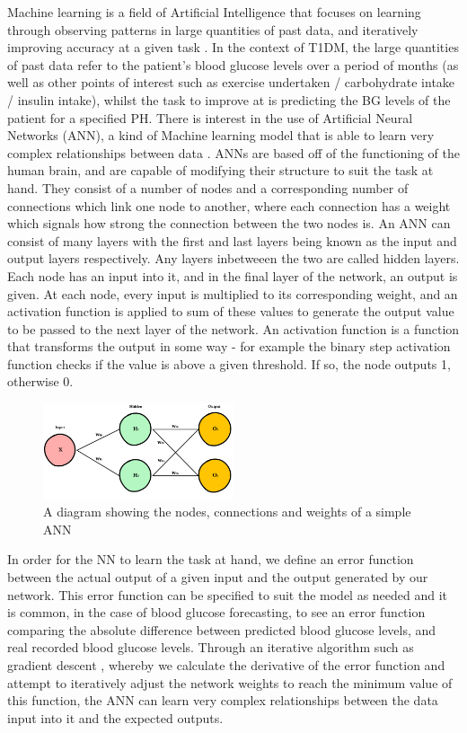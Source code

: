       Machine learning is a field of Artificial Intelligence that focuses on learning through observing patterns in large quantities of past data, and iteratively improving accuracy at a given task \cite{whatisml}. In the context of T1DM, the large quantities of past data refer to the patient's blood glucose levels over a period of months (as well as other points of interest such as exercise undertaken / carbohydrate intake / insulin intake), whilst the task to improve at is predicting the BG levels of the patient for a specified PH. There is interest in the use of Artificial Neural Networks (ANN), a kind of Machine learning model that is able to learn very complex relationships between data \cite{whatisnn}. ANNs are based off of the functioning of the human brain, and are capable of modifying their structure to suit the task at hand. They consist of a number of nodes and a corresponding number of connections which link one node to another, where each connection has a weight which signals how strong the connection between the two nodes is. An ANN can consist of many layers with the first and last layers being known as the input and output layers respectively. Any layers inbetweeen the two are called hidden layers. Each node has an input into it, and in the final layer of the network, an output is given. At each node, every input is multiplied to its corresponding weight, and an activation function is applied to sum of these values to generate the output value to be passed to the next layer of the network. An activation function is a function that transforms the output in some way - for example the binary step activation function checks if the value is above a given threshold. If so, the node outputs 1, otherwise 0.
      \begin{figure}[H]
        \centering
        \includegraphics[width=0.5\textwidth]{images/basicNN.png}
        \caption{
         A diagram showing the nodes, connections and weights of a simple ANN \cite{whatisnnimage}
        }
      \end{figure}
      In order for the NN to learn the task at hand, we define an error function between the actual output of a given input and the output generated by our network. This error function can be specified to suit the model as needed and it is common, in the case of blood glucose forecasting, to see an error function comparing the absolute difference between predicted blood glucose levels, and real recorded blood glucose levels. Through an iterative algorithm such as gradient descent \cite{whatisgd}, whereby we calculate the derivative of the error function and attempt to iteratively adjust the network weights to reach the minimum value of this function, the ANN can learn very complex relationships between the data input into it and the expected outputs. 
